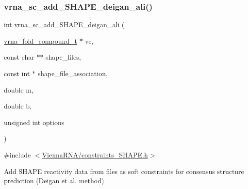 \subsubsection{\texorpdfstring{vrna\+\_\+sc\+\_\+add\+\_\+\+S\+H\+A\+P\+E\+\_\+deigan\+\_\+ali()}{vrna\_sc\_add\_SHAPE\_deigan\_ali()}}
{\footnotesize\ttfamily int vrna\+\_\+sc\+\_\+add\+\_\+\+S\+H\+A\+P\+E\+\_\+deigan\+\_\+ali (\begin{DoxyParamCaption}\item[{\hyperlink{group__fold__compound_ga1b0cef17fd40466cef5968eaeeff6166}{vrna\+\_\+fold\+\_\+compound\+\_\+t} $\ast$}]{vc,  }\item[{const char $\ast$$\ast$}]{shape\+\_\+files,  }\item[{const int $\ast$}]{shape\+\_\+file\+\_\+association,  }\item[{double}]{m,  }\item[{double}]{b,  }\item[{unsigned int}]{options }\end{DoxyParamCaption})}



{\ttfamily \#include $<$\hyperlink{constraints__SHAPE_8h}{Vienna\+R\+N\+A/constraints\+\_\+\+S\+H\+A\+P\+E.\+h}$>$}



Add S\+H\+A\+PE reactivity data from files as soft constraints for consensus structure prediction (Deigan et al. method) 


